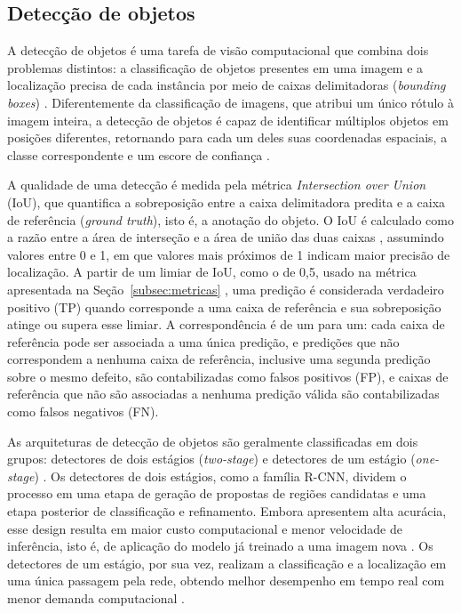 \documentclass[
    12pt,                %
    openright,           %
    oneside,             %
    a4paper,             %
    english,             %
    brazil               %
]{abntex2}
\begin{document}
\subsection{Detecção de objetos}
\label{subsec:deteccao_objetos}

A detecção de objetos é uma tarefa de visão computacional que combina 
dois problemas distintos: a classificação de objetos presentes em uma 
imagem e a localização precisa de cada instância por meio de caixas 
delimitadoras (\textit{bounding boxes}) \cite{Hussain2023}. Diferentemente 
da classificação de imagens, que atribui um único rótulo à imagem 
inteira, a detecção de objetos é capaz de identificar múltiplos 
objetos em posições diferentes, retornando para cada um deles 
suas coordenadas espaciais, a classe correspondente e um escore 
de confiança \cite{Ramos2025}.

A qualidade de uma detecção é medida pela métrica
\textit{Intersection over Union} (IoU), que quantifica a sobreposição
entre a caixa delimitadora predita e a caixa de referência
(\textit{ground truth}), isto é, a anotação do objeto. O IoU é calculado como a razão entre a área de
interseção e a área de união das duas caixas \cite{Xu2022}, assumindo
valores entre 0 e 1, em que valores mais próximos de 1 indicam maior
precisão de localização. A partir de um limiar de IoU, como o de 0,5,
usado na métrica apresentada na Seção~\ref{subsec:metricas}
\cite{Ramos2025}, uma predição é considerada verdadeiro positivo (TP)
quando corresponde a uma caixa de referência e sua sobreposição atinge
ou supera esse limiar. A correspondência é de um para um: cada caixa
de referência pode ser associada a uma única predição, e predições que
não correspondem a nenhuma caixa de referência, inclusive uma segunda
predição sobre o mesmo defeito, são contabilizadas como falsos positivos
(FP), e caixas de referência que não são associadas a nenhuma predição
válida são contabilizadas como falsos negativos (FN).

As arquiteturas de detecção de objetos são geralmente 
classificadas em dois grupos: detectores de dois estágios 
(\textit{two-stage}) e detectores de um estágio 
(\textit{one-stage}) \cite{Hussain2023}. Os detectores de dois 
estágios, como a família R-CNN, dividem o processo em uma etapa 
de geração de propostas de regiões candidatas e uma etapa 
posterior de classificação e refinamento. Embora apresentem alta 
acurácia, esse design resulta em maior custo computacional e 
menor velocidade de inferência, isto é, de aplicação do modelo já
treinado a uma imagem nova \cite{Situ2023}. Os detectores 
de um estágio, por sua vez, realizam a classificação e a 
localização em uma única passagem pela rede, obtendo melhor 
desempenho em tempo real com menor demanda computacional 
\cite{Hussain2023}.
\end{document}
